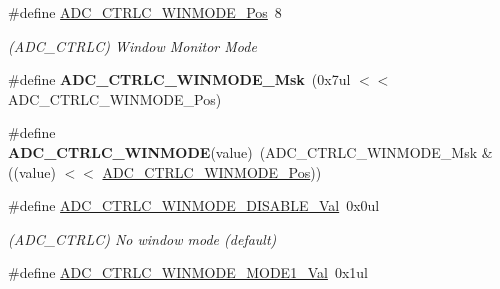 \begin{DoxyCompactItemize}
\item 
\hypertarget{group___s_a_m_l21___a_d_c_ga8a34af6e2a3244ddd1ffc8e1f6b78f42}{}\#define \hyperlink{group___s_a_m_l21___a_d_c_ga8a34af6e2a3244ddd1ffc8e1f6b78f42}{A\+D\+C\+\_\+\+C\+T\+R\+L\+C\+\_\+\+W\+I\+N\+M\+O\+D\+E\+\_\+\+Pos}~8\label{group___s_a_m_l21___a_d_c_ga8a34af6e2a3244ddd1ffc8e1f6b78f42}

\begin{DoxyCompactList}\small\item\em (A\+D\+C\+\_\+\+C\+T\+R\+L\+C) Window Monitor Mode \end{DoxyCompactList}\item 
\hypertarget{group___s_a_m_l21___a_d_c_ga3dadcc4acf3685ace7c4572b3e6236dd}{}\#define {\bfseries A\+D\+C\+\_\+\+C\+T\+R\+L\+C\+\_\+\+W\+I\+N\+M\+O\+D\+E\+\_\+\+Msk}~(0x7ul $<$$<$ A\+D\+C\+\_\+\+C\+T\+R\+L\+C\+\_\+\+W\+I\+N\+M\+O\+D\+E\+\_\+\+Pos)\label{group___s_a_m_l21___a_d_c_ga3dadcc4acf3685ace7c4572b3e6236dd}

\item 
\hypertarget{group___s_a_m_l21___a_d_c_ga094219ce08fd56541b172118791ca466}{}\#define {\bfseries A\+D\+C\+\_\+\+C\+T\+R\+L\+C\+\_\+\+W\+I\+N\+M\+O\+D\+E}(value)~(A\+D\+C\+\_\+\+C\+T\+R\+L\+C\+\_\+\+W\+I\+N\+M\+O\+D\+E\+\_\+\+Msk \& ((value) $<$$<$ \hyperlink{group___s_a_m_l21___a_d_c_ga8a34af6e2a3244ddd1ffc8e1f6b78f42}{A\+D\+C\+\_\+\+C\+T\+R\+L\+C\+\_\+\+W\+I\+N\+M\+O\+D\+E\+\_\+\+Pos}))\label{group___s_a_m_l21___a_d_c_ga094219ce08fd56541b172118791ca466}

\item 
\hypertarget{group___s_a_m_l21___a_d_c_gaf0c4a29d6a07865f1d95046c1f1802de}{}\#define \hyperlink{group___s_a_m_l21___a_d_c_gaf0c4a29d6a07865f1d95046c1f1802de}{A\+D\+C\+\_\+\+C\+T\+R\+L\+C\+\_\+\+W\+I\+N\+M\+O\+D\+E\+\_\+\+D\+I\+S\+A\+B\+L\+E\+\_\+\+Val}~0x0ul\label{group___s_a_m_l21___a_d_c_gaf0c4a29d6a07865f1d95046c1f1802de}

\begin{DoxyCompactList}\small\item\em (A\+D\+C\+\_\+\+C\+T\+R\+L\+C) No window mode (default) \end{DoxyCompactList}\item 
\hypertarget{group___s_a_m_l21___a_d_c_gaa0a1cde0540a1b9dc8583433a86f51b9}{}\#define \hyperlink{group___s_a_m_l21___a_d_c_gaa0a1cde0540a1b9dc8583433a86f51b9}{A\+D\+C\+\_\+\+C\+T\+R\+L\+C\+\_\+\+W\+I\+N\+M\+O\+D\+E\+\_\+\+M\+O\+D\+E1\+\_\+\+Val}~0x1ul\label{group___s_a_m_l21___a_d_c_gaa0a1cde0540a1b9dc8583433a86f51b9}


\end{DoxyCompactItemize}
